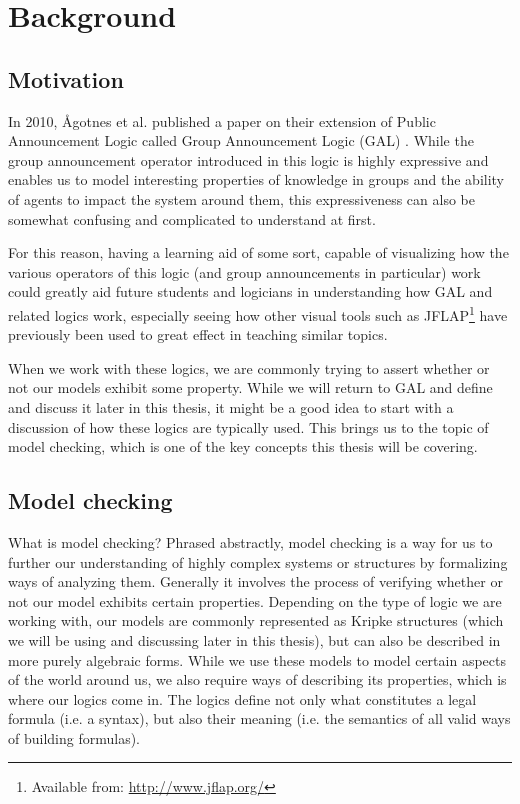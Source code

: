 \section{Background}\label{sec:back}

\subsection{Motivation}

In 2010, Ågotnes et al. published a paper on their extension of Public Announcement Logic called Group Announcement Logic (GAL) \cite{Agotnes2010}. While the group announcement operator introduced in this logic is highly expressive and enables us to model interesting properties of knowledge in groups and the ability of agents to impact the system around them, this expressiveness can also be somewhat confusing and complicated to understand at first. 

For this reason, having a learning aid of some sort, capable of visualizing how the various operators of this logic (and group announcements in particular) work could greatly aid future students and logicians in understanding how GAL and related logics work, especially seeing how other visual tools such as JFLAP\footnote{Available from: \url{http://www.jflap.org/}} have previously been used to great effect in teaching similar topics. 

When we work with these logics, we are commonly trying to assert whether or not our models exhibit some property. While we will return to GAL and define and discuss it later in this thesis, it might be a good idea to start with a discussion of how these logics are typically used. This brings us to the topic of model checking, which is one of the key concepts this thesis will be covering.

\subsection{Model checking}

What is model checking? Phrased abstractly, model checking is a way for us to further our understanding of highly complex systems or structures by formalizing ways of analyzing them. Generally it involves the process of verifying whether or not our model exhibits certain properties. Depending on the type of logic we are working with, our models are commonly represented as Kripke structures\cite{Van2007dynamic} (which we will be using and discussing later in this thesis), but can also be described in more purely algebraic forms. While we use these models to model certain aspects of the world around us, we also require ways of describing its properties, which is where our logics come in. The logics define not only what constitutes a legal formula (i.e. a syntax), but also their meaning (i.e. the semantics of all valid ways of building formulas). 

